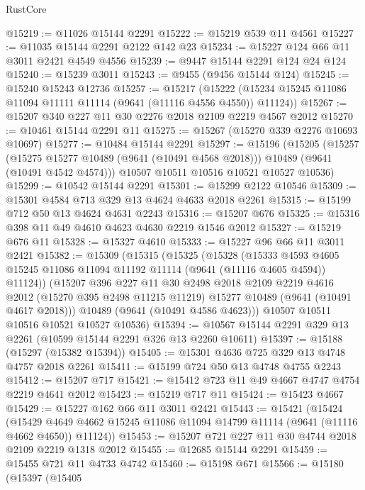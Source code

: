 \begin{lexlean}{RustCore}
\begin{coremodule}
@15219 := @11026 @15144 @2291
@15222 := @15219 @539 @11 @4561
@15227 := @11035 @15144 @2291 @2122 @142 @23
@15234 := @15227 @124 @66 @11 @3011 @2421 @4549 @4556
@15239 := @9447 @15144 @2291 @124 @24 @124
@15240 := @15239 @3011
@15243 := @9455 (@9456 @15144 @124)
@15245 := @15240 @15243 @12736
@15257 := @15217
    (@15222 (@15234 @15245 @11086 @11094 @11111 @11114 (@9641 (@11116 @4556 @4550)) @11124))
@15267 := @15207 @340 @227 @11 @30 @2276 @2018 @2109 @2219 @4567 @2012
@15270 := @10461 @15144 @2291 @11
@15275 := @15267 (@15270 @339 @2276 @10693 @10697)
@15277 := @10484 @15144 @2291
@15297 := @15196
    (@15205
      (@15257
        (@15275 @15277 @10489 (@9641 (@10491 @4568 @2018)))
        @10489
        (@9641 (@10491 @4542 @4574)))
      @10507
      @10511
      @10516
      @10521
      @10527
      @10536)
@15299 := @10542 @15144 @2291
@15301 := @15299 @2122 @10546
@15309 := @15301 @4584 @713 @329 @13 @4624 @4633 @2018 @2261
@15315 := @15199 @712 @50 @13 @4624 @4631 @2243
@15316 := @15207 @676
@15325 := @15316 @398 @11 @49 @4610 @4623 @4630 @2219 @1546 @2012
@15327 := @15219 @676 @11
@15328 := @15327 @4610
@15333 := @15227 @96 @66 @11 @3011 @2421
@15382 := @15309
    (@15315
      (@15325
        (@15328
          (@15333
            @4593
            @4605
            @15245
            @11086
            @11094
            @11192
            @11114
            (@9641 (@11116 @4605 @4594))
            @11124))
        (@15207
          @396
          @227
          @11
          @30
          @2498
          @2018
          @2109
          @2219
          @4616
          @2012
          (@15270 @395 @2498 @11215 @11219)
          @15277
          @10489
          (@9641 (@10491 @4617 @2018)))
        @10489
        (@9641 (@10491 @4586 @4623)))
      @10507
      @10511
      @10516
      @10521
      @10527
      @10536)
@15394 := @10567 @15144 @2291 @329 @13 @2261 (@10599 @15144 @2291 @326 @13 @2260 @10611)
@15397 := @15188 (@15297 (@15382 @15394))
@15405 := @15301 @4636 @725 @329 @13 @4748 @4757 @2018 @2261
@15411 := @15199 @724 @50 @13 @4748 @4755 @2243
@15412 := @15207 @717
@15421 := @15412 @723 @11 @49 @4667 @4747 @4754 @2219 @4641 @2012
@15423 := @15219 @717 @11
@15424 := @15423 @4667
@15429 := @15227 @162 @66 @11 @3011 @2421
@15443 := @15421
    (@15424
      (@15429 @4649 @4662 @15245 @11086 @11094 @14799 @11114 (@9641 (@11116 @4662 @4650)) @11124))
@15453 := @15207 @721 @227 @11 @30 @4744 @2018 @2109 @2219 @1318 @2012
@15455 := @12685 @15144 @2291
@15459 := @15455 @721 @11 @4733 @4742
@15460 := @15198 @671
@15566 := @15180
    (@15397
      (@15405

\end{coremodule}
\end{lexlean}
